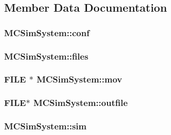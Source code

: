 \subsection{Member Data Documentation}
\hypertarget{class_m_c_sim_system_a4d6bf102d6233f299097ca228e1d5a1b}{
\subsubsection[{conf}]{ M\+C\+Sim\+System\+::conf\hspace{0.3cm}{\ttfamily [private]}}}\label{class_m_c_sim_system_a4d6bf102d6233f299097ca228e1d5a1b}
\hypertarget{class_m_c_sim_system_a251780d565abe7fe418ecd9ce0ba7aaa}{
\subsubsection[{files}]{ M\+C\+Sim\+System\+::files\hspace{0.3cm}{\ttfamily [private]}}}\label{class_m_c_sim_system_a251780d565abe7fe418ecd9ce0ba7aaa}
\hypertarget{class_m_c_sim_system_af99ffcf84213091b20ff0e2e9c5fc0a4}{
\subsubsection[{mov}]{\setlength{\rightskip}{0pt plus 5cm}F\+I\+L\+E $\ast$ M\+C\+Sim\+System\+::mov\hspace{0.3cm}{\ttfamily [private]}}}\label{class_m_c_sim_system_af99ffcf84213091b20ff0e2e9c5fc0a4}
\hypertarget{class_m_c_sim_system_afcf7ff09960e6fe9ebcd0af9d6ef5c77}{
\subsubsection[{outfile}]{\setlength{\rightskip}{0pt plus 5cm}F\+I\+L\+E$\ast$ M\+C\+Sim\+System\+::outfile\hspace{0.3cm}{\ttfamily [private]}}}\label{class_m_c_sim_system_afcf7ff09960e6fe9ebcd0af9d6ef5c77}
\hypertarget{class_m_c_sim_system_a157d4d5a003e91c72b954873e0a4593e}{
\subsubsection[{sim}]{ M\+C\+Sim\+System\+::sim\hspace{0.3cm}{\ttfamily [private]}}}\label{class_m_c_sim_system_a157d4d5a003e91c72b954873e0a4593e}
